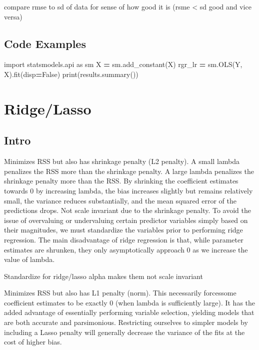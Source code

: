 \documentclass[]{book}
\newenvironment{Shaded}{\begin{snugshade}}{\end{snugshade}}
\newcommand{\ImportTok}[1]{#1}
\newcommand{\VariableTok}[1]{\textcolor[rgb]{0.00,0.00,0.00}{#1}}
\newcommand{\OperatorTok}[1]{\textcolor[rgb]{0.81,0.36,0.00}{\textbf{#1}}}
\newcommand{\BuiltInTok}[1]{#1}
\newcommand{\NormalTok}[1]{#1}
\theoremstyle{definition}
\theoremstyle{definition}
\theoremstyle{definition}
\theoremstyle{remark}
\begin{document}
compare rmse to sd of data for sense of how good it is (rsme \textless{}
sd good and vice versa)

\subsection{Code Examples}\label{code-examples}

\begin{Shaded}
\begin{Highlighting}[]
\ImportTok{import}\NormalTok{ statsmodels.api }\ImportTok{as}\NormalTok{ sm}
\NormalTok{X }\OperatorTok{=}\NormalTok{ sm.add_constant(X)}
\NormalTok{rgr_lr }\OperatorTok{=}\NormalTok{ sm.OLS(Y, X).fit(disp}\OperatorTok{=}\VariableTok{False}\NormalTok{)}
\BuiltInTok{print}\NormalTok{(results.summary())}
\end{Highlighting}
\end{Shaded}

\section{Ridge/Lasso}\label{ridgelasso}

\subsection{Intro}\label{intro-7}

Minimizes RSS but also has shrinkage penalty (L2 penalty). A small
lambda penalizes the RSS more than the shrinkage penalty. A large lambda
penalizes the shrinkage penalty more than the RSS. By shrinking the
coefficient estimates towards 0 by increasing lambda, the bias increases
slightly but remains relatively small, the variance reduces
substantially, and the mean squared error of the predictions drops. Not
scale invariant due to the shrinkage penalty. To avoid the issue of
overvaluing or undervaluing certain predictor variables simply based on
their magnitudes, we must standardize the variables prior to performing
ridge regression. The main disadvantage of ridge regression is that,
while parameter estimates are shrunken, they only asymptotically
approach 0 as we increase the value of lambda.

Standardize for ridge/lasso alpha makes them not scale invariant

Minimizes RSS but also has L1 penalty (norm). This necessarily
forcessome coefficient estimates to be exactly 0 (when lambda is
sufficiently large). It has the added advantage of essentially
performing variable selection, yielding models that are both accurate
and parsimonious. Restricting ourselves to simpler models by including a
Lasso penalty will generally decrease the variance of the fits at the
cost of higher bias.
\end{document}
